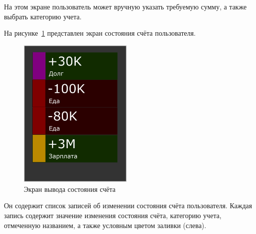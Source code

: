На этом экране пользователь может вручную указать требуемую сумму,
а также выбрать категорию учета.

На рисунке~\ref{fig:screen_account} представлен экран состояния
счёта пользователя.

\begin{figure}[h!]
  \centering
  \includegraphics[width=55mm]{pic/screen_account}
  \caption{Экран вывода состояния счёта}
  \label{fig:screen_account}
\end{figure}

Он содержит список записей об изменении состояния счёта пользователя.
Каждая запись содержит значение изменения состояния счёта, категорию
учета, отмеченную названием, а также условным цветом заливки (слева).